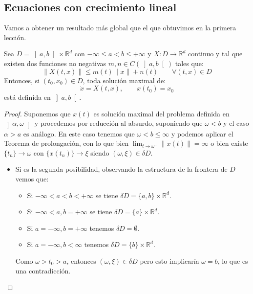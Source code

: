 \subsection{Ecuaciones con crecimiento lineal}
\noindent
Vamos a obtener un resultado más global que el que obtuvimos en la primera lección. 

\begin{teo}\label{teo:crecimiento_lineal}
    Sea $D = \left]a,b\right[\times \mathbb{R}^d$ con $-\infty\leq a < b\leq +\infty$ y $X:D\to \mathbb{R}^d$ continuo y tal que existen dos funciones no negativas $m,n\in C(\left]a,b\right[)$ tales que:
    \begin{equation*}
        \|X(t,x)\| \leq m(t)\|x\| + n(t) \qquad \forall (t,x)\in D
    \end{equation*}
    Entonces, si $(t_0,x_0)\in D$, toda solución maximal de:
    \begin{equation*}
        \dot{x} = X(t,x), \qquad x(t_0) = x_0
    \end{equation*}
    está definida en $\left]a,b\right[$.
    \begin{proof}
        Suponemos que $x(t)$ es solución maximal del problema definida en $\left]\alpha,\omega\right[$ y procedemos por reducción al absurdo, suponiendo que $\omega < b$ y el caso $\alpha>a$ es análogo. En este caso tenemos que $\omega<b\leq \infty$ y podemos aplicar el Teorema de prolongación, con lo que bien $\lim_{t\to\omega^-}\|x(t)\| = \infty$ o bien existe $\{t_n\}\to\omega$ con $\{x(t_n)\}\to \xi$ siendo $(\omega,\xi)\in \delta D$.
        \begin{itemize}
            \item Si es la segunda posibilidad, observando la estructura de la frontera de $D$ vemos que:
                \begin{itemize}
                    \item Si $-\infty<a<b<+\infty$ se tiene $\delta D = \{a,b\}\times \mathbb{R}^d$.
                    \item Si $-\infty<a, b = +\infty$ se tiene $\delta D = \{a\}\times \mathbb{R}^d$.
                    \item Si $a = -\infty, b = +\infty$ tenemos $\delta D = \emptyset $.
                    \item Si $a=-\infty, b < \infty$ tenemos $\delta D = \{b\}\times \mathbb{R}^d$.
                \end{itemize}
                Como $\omega>t_0>a$, entonces $(\omega,\xi)\in \delta D$ pero esto implicaría $\omega = b$, lo que es una contradicción.

\end{itemize}
\end{proof}
\end{teo}
